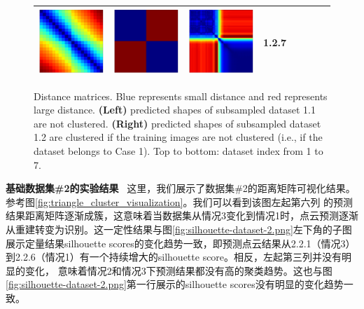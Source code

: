 \documentclass[bachelor, nocolorlinks, printoneside]{seuthesis} %
\begin{document}
\begin{Main}
\begin{figure}[ht!]
\begin{centering}
\begin{tabular}{cccc|cccc}
        \includegraphics[width=0.12\columnwidth,keepaspectratio]{figs/toyset_matrices/cluster_2by10_7_1.png} &
        \includegraphics[width=0.12\columnwidth,keepaspectratio]{figs/toyset_matrices/cluster_2by10_7_2.png} &
        \includegraphics[width=0.12\columnwidth,keepaspectratio]{figs/toyset_matrices/cluster_2by10_7_3.png} & 1.2.7\\
        \bottomrule  
        \end{tabular}  \vspace{-2mm}
        \caption{\small Distance matrices. Blue represents small distance and red represents large distance. {\bf (Left)} predicted shapes of subsampled dataset 1.1 are not clustered. {\bf (Right)} predicted shapes of subsampled dataset 1.2 are clustered if the training images are not clustered (i.e., if the dataset belongs to Case 1). Top to bottom: dataset index from 1 to 7.}
        \label{fig:cluster_visualization}
    \end{centering}
    \end{figure}
\FloatBarrier
\textbf{基础数据集\#2的实验结果} ~这里，我们展示了数据集\#2的距离矩阵可视化结果。参考图\ref{fig:triangle_cluster_visualization}。我们可以看到该图左起第六列
的预测结果距离矩阵逐渐成簇，这意味着当数据集从情况3变化到情况1时，点云预测逐渐从重建转变为识别。这一定性结果与图\ref{fig:silhouette-dataset-2.png}左下角的子图
展示定量结果silhouette scores的变化趋势一致，即预测点云结果从2.2.1（情况3）到2.2.6（情况1）有一个持续增大的silhouette score。相反，左起第三列并没有明显的变化，
意味着情况2和情况3下预测结果都没有高的聚类趋势。这也与图\ref{fig:silhouette-dataset-2.png}第一行展示的silhouette scores没有明显的变化趋势一致。



\end{Main}
\end{document}
